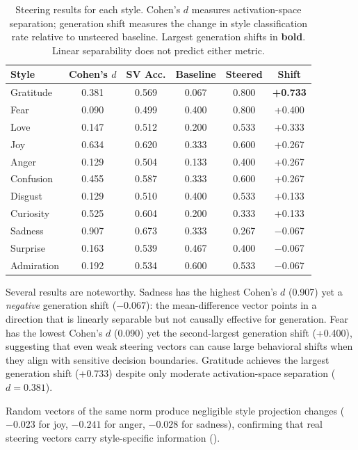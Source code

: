 \begin{table}[t]
    \centering
    \caption{Steering results for each style. Cohen's $d$ measures activation-space separation; generation shift measures the change in style classification rate relative to unsteered baseline. Largest generation shifts in \textbf{bold}. Linear separability does not predict either metric.}
    \label{tab:steering}
    \begin{tabular}{@{}lccccc@{}}
        \toprule
        Style & Cohen's $d$ & SV Acc. & Baseline & Steered & Shift \\
        \midrule
        Gratitude & 0.381 & 0.569 & 0.067 & 0.800 & \textbf{+0.733} \\
        Fear & 0.090 & 0.499 & 0.400 & 0.800 & +0.400 \\
        Love & 0.147 & 0.512 & 0.200 & 0.533 & +0.333 \\
        Joy & 0.634 & 0.620 & 0.333 & 0.600 & +0.267 \\
        Anger & 0.129 & 0.504 & 0.133 & 0.400 & +0.267 \\
        Confusion & 0.455 & 0.587 & 0.333 & 0.600 & +0.267 \\
        Disgust & 0.129 & 0.510 & 0.400 & 0.533 & +0.133 \\
        Curiosity & 0.525 & 0.604 & 0.200 & 0.333 & +0.133 \\
        Sadness & 0.907 & 0.673 & 0.333 & 0.267 & $-$0.067 \\
        Surprise & 0.163 & 0.539 & 0.467 & 0.400 & $-$0.067 \\
        Admiration & 0.192 & 0.534 & 0.600 & 0.533 & $-$0.067 \\
        \bottomrule
    \end{tabular}
\end{table}

Several results are noteworthy. Sadness has the highest Cohen's $d$ (0.907) yet a \emph{negative} generation shift ($-0.067$): the mean-difference vector points in a direction that is linearly separable but not causally effective for generation. Fear has the lowest Cohen's $d$ (0.090) yet the second-largest generation shift (+0.400), suggesting that even weak steering vectors can cause large behavioral shifts when they align with sensitive decision boundaries. Gratitude achieves the largest generation shift (+0.733) despite only moderate activation-space separation ($d = 0.381$).

 Random vectors of the same norm produce negligible style projection changes ($-0.023$ for joy, $-0.241$ for anger, $-0.028$ for sadness), confirming that real steering vectors carry style-specific information ().

